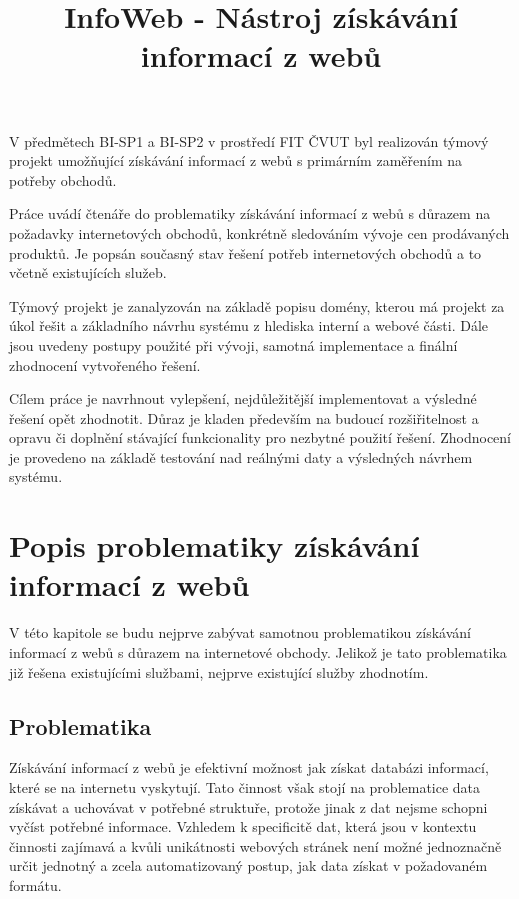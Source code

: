 \documentclass[thesis=B,czech]{FITthesis}[2012/06/26]
\title{ InfoWeb - Nástroj získávání informací z webů }
\begin{document}

\begin{introduction}
V předmětech BI-SP1 a BI-SP2 v prostředí FIT ČVUT byl realizován týmový projekt umožňující získávání informací z webů s primárním zaměřením na potřeby obchodů.
\par
Práce uvádí čtenáře do problematiky získávání informací z webů s důrazem na požadavky internetových obchodů, konkrétně sledováním
vývoje cen prodávaných produktů. Je popsán současný stav řešení potřeb internetových obchodů a to včetně existujících služeb.
\par
Týmový projekt je zanalyzován na základě popisu domény, kterou má projekt za úkol řešit a základního návrhu systému
z hlediska interní a webové části. Dále jsou uvedeny postupy použité při vývoji, samotná implementace a finální zhodnocení vytvořeného řešení.
\par
Cílem práce je navrhnout vylepšení, nejdůležitější implementovat a výsledné řešení opět zhodnotit. Důraz je kladen především na 
budoucí rozšiřitelnost a opravu či doplnění stávající funkcionality pro nezbytné použití řešení. Zhodnocení je provedeno na základě
testování nad reálnými daty a výsledných návrhem systému.
\par

\newpage

\end{introduction}


\chapter{Popis problematiky získávání informací z webů}

V této kapitole se budu nejprve zabývat samotnou problematikou získávání informací 
z webů s důrazem na internetové obchody.
Jelikož je tato problematika již řešena existujícími službami, nejprve existující služby zhodnotím.

\section{Problematika}
Získávání informací z webů je efektivní možnost jak získat databázi informací, které se na internetu vyskytují.
Tato činnost však stojí na problematice data získávat a uchovávat v potřebné struktuře, protože 
jinak z dat nejsme schopni vyčíst potřebné informace.
Vzhledem k specificitě dat, která jsou v kontextu činnosti zajímavá a kvůli unikátnosti webových stránek
není možné jednoznačně určit jednotný a zcela automatizovaný postup, jak data získat v požadovaném formátu.
\end{document}
